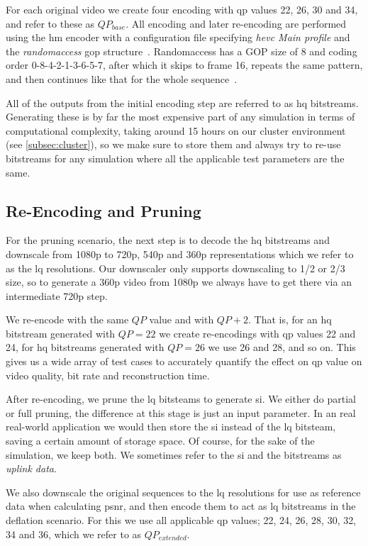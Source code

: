 For each original video we create four encoding with \gls{qp} values 22, 26, 30 and 34, and refer to these as $QP_{base}$. All encoding and later re-encoding are performed using the \gls{hm} encoder with a configuration file specifying \textit{\gls{hevc} Main profile} and the \textit{randomaccess} \gls{gop} structure~\cite{Wien_Coding_Tools}. Randomaccess has a GOP size of 8 and coding order 0-8-4-2-1-3-6-5-7, after which it skips to frame 16, repeats the same pattern, and then continues like that for the whole sequence~\cite{Wien_Coding_Tools}.

All of the outputs from the initial encoding step are referred to as \gls{hq} bitstreams. Generating these is by far the most expensive part of any simulation in terms of computational complexity, taking around 15 hours on our cluster environment (see \cref{subsec:cluster}), so we make sure to store them and always try to re-use bitstreams for any simulation where all the applicable test parameters are the same.

\subsection{Re-Encoding and Pruning}
\label{subsec:re-encoding}
For the pruning scenario, the next step is to decode the \gls{hq} bitstreams and downscale from 1080p to 720p, 540p and 360p representations which we refer to as the \gls{lq} resolutions. Our downscaler only supports downscaling to 1/2 or 2/3 size, so to generate a 360p video from 1080p we always have to get there via an intermediate 720p step.

We re-encode with the same $QP$ value and with $QP + 2$. That is, for an \gls{hq} bitstream generated with $QP=22$ we create re-encodings with \gls{qp} values 22 and 24, for \gls{hq} bitstreams generated with $QP=26$ we use 26 and 28, and so on. This gives us a wide array of test cases to accurately quantify the effect on \gls{qp} value on video quality, bit rate and reconstruction time.

After re-encoding, we prune the \gls{lq} bitsteams to generate \gls{si}. We either do partial or full pruning, the difference at this stage is just an input parameter. In an real real-world application we would then store the \gls{si} instead of the \gls{lq} bitsteam, saving a certain amount of storage space. Of course, for the sake of the simulation, we keep both. We sometimes refer to the \gls{si} and the bitstreams as \textit{uplink data}.

We also downscale the original sequences to the \gls{lq} resolutions for use as reference data when calculating \gls{psnr}, and then encode them to act as \gls{lq} bitstreams in the deflation scenario. For this we use all applicable \gls{qp} values; 22, 24, 26, 28, 30, 32, 34 and 36, which we refer to as $QP_{extended}$.

